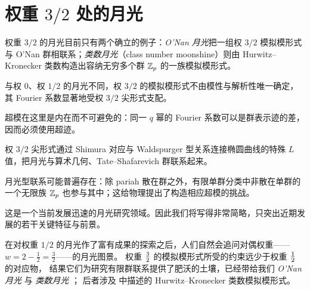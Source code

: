 \section{权重 $3/2$ 处的月光}
\label{ch:moonshineweight32}

\begin{keytakeaways}
  \item 权重 $3/2$ 的月光目前只有两个确立的例子：\emph{O'Nan 月光}把一组权 $3/2$ 模拟模形式与 O'Nan 群相联系；\emph{类数月光}（class number moonshine）则由 Hurwitz–Kronecker 类数构造出容纳无穷多个群 $\mathbb{Z}_p$ 的一族模拟模形式。
  \item 与权 $0$、权 $1/2$ 的月光不同，权 $3/2$ 的模拟模形式不由模性与解析性唯一确定，其 Fourier 系数显著地受权 $3/2$ 尖形式支配。
  \item 超模在这里是内在而不可避免的：同一 $q$ 幂的 Fourier 系数可以是群表示迹的差，因而必须使用超迹。
  \item 权 $3/2$ 尖形式通过 Shimura 对应与 Waldspurger 型关系连接椭圆曲线的特殊 $L$ 值，把月光与算术几何、Tate–Shafarevich 群联系起来。
  \item 月光型联系可能普遍存在：除 pariah 散在群之外，有限单群分类中非散在单群的一个无限族 $\mathbb{Z}_p$ 也参与其中；这给物理提出了构造相应超模的挑战。
\end{keytakeaways}

这是一个当前发展迅速的月光研究领域。因此我们将写得非常简略，只突出近期发展的若干关键特征与前景。


在对权重 $1/2$ 的月光作了富有成果的探索之后，人们自然会追问对偶权重——
$w=2-\frac{1}{2}=\frac{3}{2}$——的月光图景。
权重 $3\over 2$ 的模拟模形式所受的约束远少于权重 $1\over 2$ 的对应物，
结果它们为研究有限群联系提供了肥沃的土壤，已经带给我们
\emph{O'Nan 月光} \cite{onan} 与 \emph{类数月光} \cite{class_nr_moonshine}；
后者涉及  中描述的 Hurwitz–Kronecker 类数模拟模形式。


